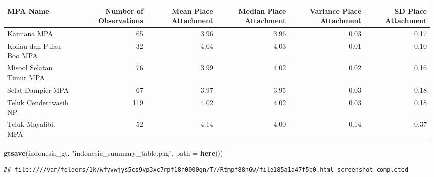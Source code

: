 \documentclass[
]{article}
\newenvironment{Shaded}{\begin{snugshade}}{\end{snugshade}}
\newcommand{\AttributeTok}[1]{\textcolor[rgb]{0.13,0.29,0.53}{#1}}
\newcommand{\FunctionTok}[1]{\textcolor[rgb]{0.13,0.29,0.53}{\textbf{#1}}}
\newcommand{\NormalTok}[1]{#1}
\newcommand{\StringTok}[1]{\textcolor[rgb]{0.31,0.60,0.02}{#1}}
\begin{document}
\begin{table}[!t]
\fontsize{12.0pt}{14.4pt}\selectfont
\begin{tabular*}{\linewidth}{@{\extracolsep{\fill}}lrrrrr}
\toprule
MPA Name & Number of Observations & Mean Place Attachment & Median Place Attachment & Variance Place Attachment & SD Place Attachment \\ 
\midrule\addlinespace[2.5pt]
Kaimana MPA & 65 & 3.96 & 3.96 & 0.03 & 0.17 \\ 
Kofiau dan Pulau  Boo MPA & 32 & 4.04 & 4.03 & 0.01 & 0.10 \\ 
Misool Selatan Timur MPA & 76 & 3.99 & 4.02 & 0.02 & 0.16 \\ 
Selat Dampier MPA & 67 & 3.97 & 3.95 & 0.03 & 0.18 \\ 
Teluk Cenderawasih NP & 119 & 4.02 & 4.02 & 0.03 & 0.18 \\ 
Teluk Mayalibit MPA & 52 & 4.14 & 4.00 & 0.14 & 0.37 \\ 
\bottomrule
\end{tabular*}
\end{table}

\begin{Shaded}
\begin{Highlighting}[]
\FunctionTok{gtsave}\NormalTok{(indonesia\_gt,}
       \StringTok{"indonesia\_summary\_table.png"}\NormalTok{,}
       \AttributeTok{path =} \FunctionTok{here}\NormalTok{())}
\end{Highlighting}
\end{Shaded}

\begin{verbatim}
## file:////var/folders/1k/wfyvwjys5cs9vp3xc7rpf18h0000gn/T//Rtmpf88h6w/file185a1a47f5b0.html screenshot completed
\end{verbatim}
\end{document}
